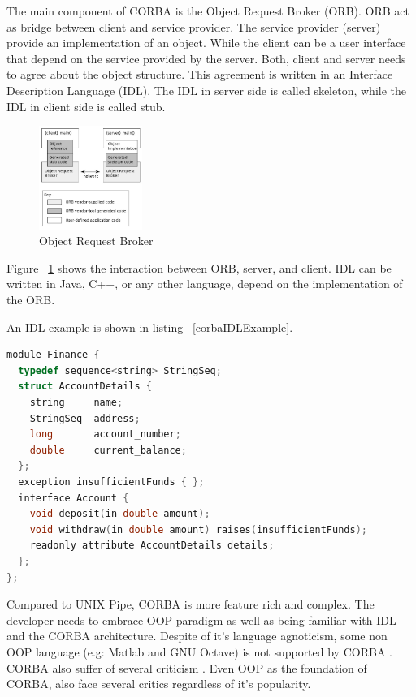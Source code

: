 \documentclass[conference]{IEEEtran}
\begin{document}
The main component of CORBA is the Object Request Broker (ORB). ORB act as bridge 
between client and service provider. The service provider (server) provide an 
implementation of an object. While the client can be a user interface that depend on
the service provided by the server. Both, client and server needs to agree about the
object structure. This agreement is written in an Interface Description Language (IDL).
The IDL in server side is called skeleton, while the IDL in client side is called stub.

\begin{figure}
	\centering
	\includegraphics[width=0.3\textwidth]
		{images/Orb.jpg}
	\caption{Object Request Broker}
	\label{fig:orb}
\end{figure}

Figure ~\ref{fig:orb} shows the interaction between ORB, server, and client.
IDL can be written in Java, C++, or any other language, depend on the implementation of
the ORB.

An IDL example is shown in listing ~\ref{corbaIDLExample}.

\begin{lstlisting}[caption=CORBA IDL Example in C++, label=corbaIDLExample, language=c, basicstyle=\small, breaklines=true]
module Finance {
  typedef sequence<string> StringSeq;
  struct AccountDetails {
    string     name;
    StringSeq  address;
    long       account_number;
    double     current_balance;
  };
  exception insufficientFunds { };
  interface Account {
    void deposit(in double amount);
    void withdraw(in double amount) raises(insufficientFunds);
    readonly attribute AccountDetails details;
  };
};
\end{lstlisting}

Compared to UNIX Pipe, CORBA is more feature rich and complex. The developer needs to 
embrace OOP paradigm as well as being familiar with IDL and the CORBA architecture. 
Despite of it's language agnoticism, some non OOP language (e.g: Matlab and GNU Octave) 
is not supported by CORBA \cite{feilhauer2016def}. CORBA also suffer of several 
criticism \cite{henning2006rise}. Even OOP as the foundation of CORBA, also face several 
critics \cite{hadar2013intuition} regardless of it's popularity.
\end{document}
